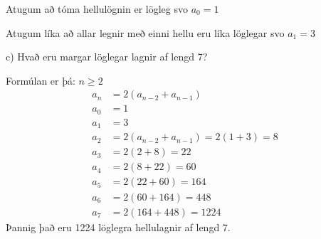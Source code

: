 Atugum að tóma hellulögnin er lögleg svo $a_0 = 1$

Atugum líka að allar legnir með einni hellu eru líka löglegar svo $a_1 =3$\vspace*{0.5em}


c) Hvað eru margar löglegar lagnir af lengd 7? 

Formúlan er þá: $n \geq 2$
\begin{align*}
    a_n &= 2(a_{n-2}+ a_{n-1})\\
    a_0 &= 1 \\ 
    a_1 &= 3 \\ 
    a_2 &= 2(a_{n-2}+ a_{n-1}) = 2(1+3) = 8\\
    a_3 &= 2(2+8) = 22\\
    a_4 &= 2(8+22) = 60\\
    a_5 &= 2(22+60) = 164\\
    a_6 &= 2(60+164) = 448\\
    a_7 &= 2(164+448) = 1224
\end{align*}
Þannig það eru 1224 löglegra hellulagnir af lengd 7.
\newpage